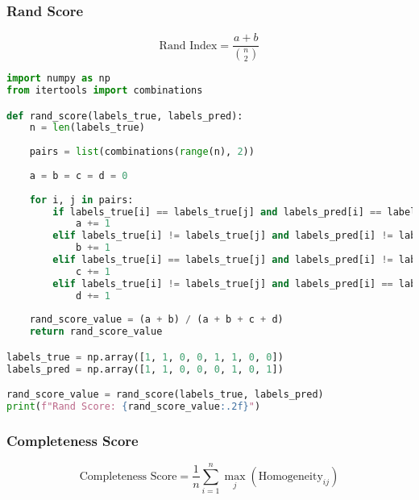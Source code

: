 \newpage

\subsubsection{Rand Score}

\[\text{Rand Index} = \frac{a + b}{\binom{n}{2}}\]

\begin{lstlisting}[language=Python]
import numpy as np
from itertools import combinations

def rand_score(labels_true, labels_pred):
    n = len(labels_true)
    
    pairs = list(combinations(range(n), 2))
    
    a = b = c = d = 0
    
    for i, j in pairs:
        if labels_true[i] == labels_true[j] and labels_pred[i] == labels_pred[j]:
            a += 1
        elif labels_true[i] != labels_true[j] and labels_pred[i] != labels_pred[j]:
            b += 1
        elif labels_true[i] == labels_true[j] and labels_pred[i] != labels_pred[j]:
            c += 1
        elif labels_true[i] != labels_true[j] and labels_pred[i] == labels_pred[j]:
            d += 1
    
    rand_score_value = (a + b) / (a + b + c + d)
    return rand_score_value

labels_true = np.array([1, 1, 0, 0, 1, 1, 0, 0])
labels_pred = np.array([1, 1, 0, 0, 0, 1, 0, 1])

rand_score_value = rand_score(labels_true, labels_pred)
print(f"Rand Score: {rand_score_value:.2f}")
\end{lstlisting}

\newpage

\subsubsection{Completeness Score}

\[\text{Completeness Score} = \frac{1}{n} \sum_{i=1}^{n} \max_j (\text{Homogeneity}_{ij})\]

